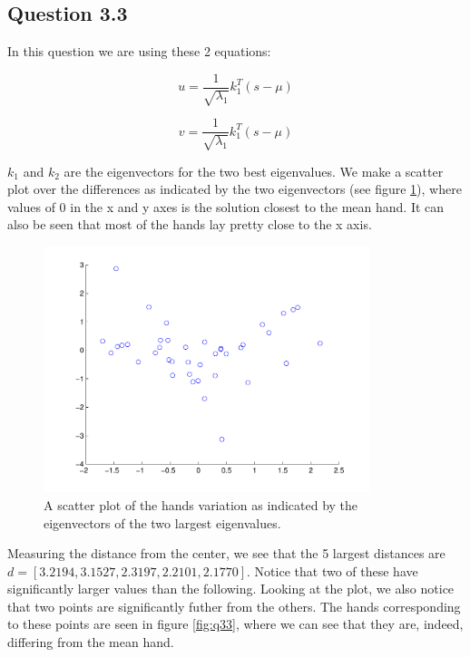 \subsection*{Question 3.3}
In this question we are using these 2 equations:

\begin{equation}
	u = \frac{1}{\sqrt{\lambda_1}}k^T_1(s-\mu)
\end{equation}

\begin{equation}
	v = \frac{1}{\sqrt{\lambda_1}}k^T_1(s-\mu)
\end{equation}

$k_1$ and $k_2$ are the eigenvectors for the two best eigenvalues. We make a scatter plot over the differences as indicated by the two eigenvectors (see figure \ref{fig:q33scatter}), where values of 0 in the x and y axes is the solution closest to the mean hand. It can also be seen that most of the hands lay pretty close to the x axis.

\begin{figure}[!htbp]
  \centering
  \includegraphics[width=0.85\textwidth]{./images/q33_scatter}
  \caption{A scatter plot of the hands variation as indicated by the eigenvectors of the two largest eigenvalues.}
  \label{fig:q33scatter}
\end{figure}

Measuring the distance from the center, we see that the 5 largest distances are\\$d = [3.2194, 3.1527, 2.3197, 2.2101, 2.1770]$.
Notice that two of these have significantly larger values than the following.
Looking at the plot, we also notice that two points are significantly futher from the others.
The hands corresponding to these points are seen in figure \ref{fig:q33}, where we can see that they are, indeed, differing from the mean hand.

